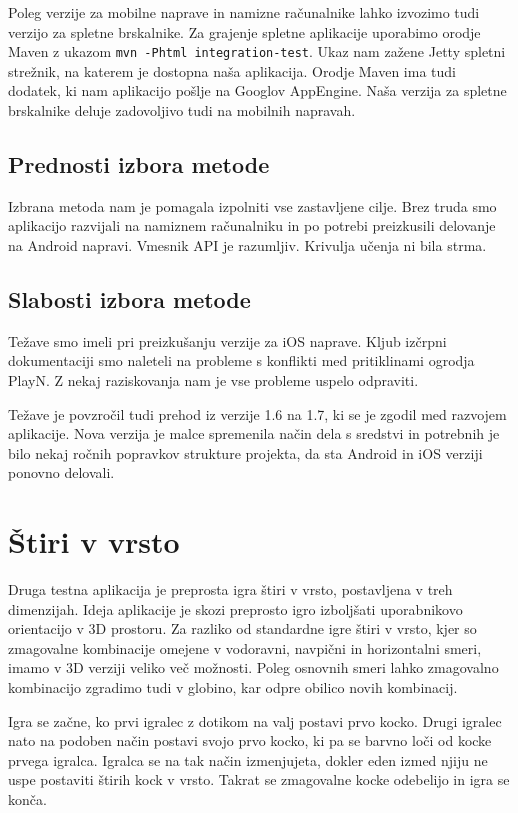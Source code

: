 Poleg verzije za mobilne naprave in namizne računalnike lahko izvozimo tudi verzijo za spletne brskalnike. Za grajenje spletne aplikacije uporabimo orodje Maven z ukazom \texttt{mvn -Phtml integration-test}. Ukaz nam zažene Jetty spletni strežnik, na katerem je dostopna naša aplikacija. Orodje Maven ima tudi dodatek, ki nam aplikacijo pošlje na Googlov AppEngine. Naša verzija za spletne brskalnike deluje zadovoljivo tudi na mobilnih napravah.

\subsection{Prednosti izbora metode}

Izbrana metoda nam je pomagala izpolniti vse zastavljene cilje. Brez truda smo aplikacijo razvijali na namiznem računalniku in po potrebi preizkusili delovanje na Android napravi. Vmesnik API je razumljiv. Krivulja učenja ni bila strma. 

\subsection{Slabosti izbora metode}

Težave smo imeli pri preizkušanju verzije za iOS naprave. Kljub izčrpni dokumentaciji smo naleteli na probleme s konflikti med pritiklinami ogrodja PlayN. Z nekaj raziskovanja nam je vse probleme uspelo odpraviti. 

Težave je povzročil tudi prehod iz verzije 1.6 na 1.7, ki se je zgodil med razvojem aplikacije. Nova verzija je malce spremenila način dela s sredstvi in potrebnih je bilo nekaj ročnih popravkov strukture projekta, da sta Android in iOS verziji ponovno delovali.

\section{Štiri v vrsto}

Druga testna aplikacija je preprosta igra štiri v vrsto, postavljena v treh dimenzijah. Ideja aplikacije je skozi preprosto igro izboljšati uporabnikovo orientacijo v 3D prostoru. Za razliko od standardne igre štiri v vrsto, kjer so zmagovalne kombinacije omejene v vodoravni, navpični in horizontalni smeri, imamo v 3D verziji veliko več možnosti. Poleg osnovnih smeri lahko zmagovalno kombinacijo zgradimo tudi v globino, kar odpre obilico novih kombinacij.

Igra se začne, ko prvi igralec z dotikom na valj postavi prvo kocko. Drugi igralec nato na podoben način postavi svojo prvo kocko, ki pa se barvno loči od kocke prvega igralca. Igralca se na tak način izmenjujeta, dokler eden izmed njiju ne uspe postaviti štirih kock v vrsto. Takrat se zmagovalne kocke odebelijo in igra se konča.

